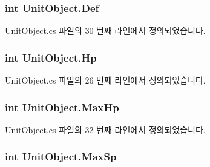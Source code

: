 \subsubsection[{\texorpdfstring{Def}{Def}}]{\setlength{\rightskip}{0pt plus 5cm}int Unit\+Object.\+Def\hspace{0.3cm}{\ttfamily [get]}}\hypertarget{class_unit_object_a35b9e7e361b6757ea62ae961fc638cd9}{}\label{class_unit_object_a35b9e7e361b6757ea62ae961fc638cd9}


Unit\+Object.\+cs 파일의 30 번째 라인에서 정의되었습니다.

\subsubsection[{\texorpdfstring{Hp}{Hp}}]{\setlength{\rightskip}{0pt plus 5cm}int Unit\+Object.\+Hp\hspace{0.3cm}{\ttfamily [get]}}\hypertarget{class_unit_object_a07153bf66bf9922005e9421629d3b697}{}\label{class_unit_object_a07153bf66bf9922005e9421629d3b697}


Unit\+Object.\+cs 파일의 26 번째 라인에서 정의되었습니다.

\subsubsection[{\texorpdfstring{Max\+Hp}{MaxHp}}]{\setlength{\rightskip}{0pt plus 5cm}int Unit\+Object.\+Max\+Hp\hspace{0.3cm}{\ttfamily [get]}}\hypertarget{class_unit_object_a1d15c3814aaa733055fae8235c45def7}{}\label{class_unit_object_a1d15c3814aaa733055fae8235c45def7}


Unit\+Object.\+cs 파일의 32 번째 라인에서 정의되었습니다.

\subsubsection[{\texorpdfstring{Max\+Sp}{MaxSp}}]{\setlength{\rightskip}{0pt plus 5cm}int Unit\+Object.\+Max\+Sp\hspace{0.3cm}{\ttfamily [get]}}\hypertarget{class_unit_object_a484552912394874ea5cb91ea567b6cd4}{}\label{class_unit_object_a484552912394874ea5cb91ea567b6cd4}


